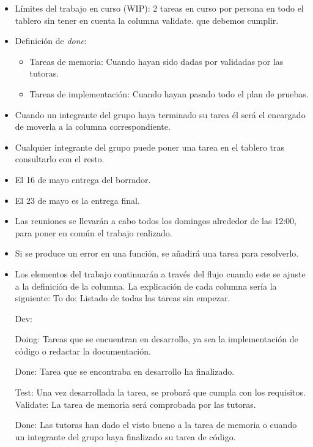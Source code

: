 \begin{itemize}
    \item Límites del trabajo en curso (WIP): 2 tareas en curso por persona en todo el tablero sin tener en cuenta la columna validate. que debemos cumplir.
    \item Definición de \textit{done}:
          \begin{itemize}
              \item Tareas de memoria: Cuando hayan sido dadas por validadas por las tutoras.
              \item Tareas de implementación: Cuando hayan pasado todo el plan de pruebas.
          \end{itemize}
    \item Cuando un integrante del grupo haya terminado su tarea él será el encargado de moverla a la columna correspondiente.
    \item Cualquier integrante del grupo puede poner una tarea en el tablero tras consultarlo con el resto.
    \item El 16 de mayo entrega del borrador.
    \item El 23 de mayo es la entrega final.
    \item Las reuniones se  llevarán a cabo todos los domingos alrededor de las 12:00, para poner en común el trabajo realizado.
    \item Si se produce un error en una función, se añadirá una tarea para resolverlo.
    \item Los elementos del trabajo continuarán a través del flujo cuando este se ajuste a la definición de la columna. La explicación de cada columna sería la siguiente:
          To do: Listado de todas las tareas sin empezar.

          Dev:

          \indent Doing: Tareas que se encuentran en desarrollo, ya sea la implementación de código o redactar la documentación.

          \indent Done: Tarea que se encontraba en desarrollo ha finalizado.

          Test: Una vez desarrollada la tarea, se probará que cumpla con los requisitos.
          Validate: La tarea de memoria será comprobada por las tutoras.

          Done: Las tutoras han dado el visto bueno a la tarea de memoria o cuando un integrante del grupo haya finalizado su tarea de código.




\end{itemize}

